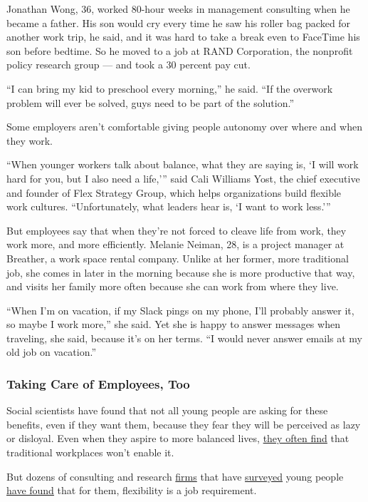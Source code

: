 Jonathan Wong, 36, worked 80-hour weeks in management consulting when he
became a father. His son would cry every time he saw his roller bag
packed for another work trip, he said, and it was hard to take a break
even to FaceTime his son before bedtime. So he moved to a job at RAND
Corporation, the nonprofit policy research group --- and took a 30
percent pay cut.

``I can bring my kid to preschool every morning,'' he said. ``If the
overwork problem will ever be solved, guys need to be part of the
solution.''

Some employers aren't comfortable giving people autonomy over where and
when they work.

``When younger workers talk about balance, what they are saying is, `I
will work hard for you, but I also need a life,''' said Cali Williams
Yost, the chief executive and founder of Flex Strategy Group, which
helps organizations build flexible work cultures. ``Unfortunately, what
leaders hear is, `I want to work less.'''

But employees say that when they're not forced to cleave life from work,
they work more, and more efficiently. Melanie Neiman, 28, is a project
manager at Breather, a work space rental company. Unlike at her former,
more traditional job, she comes in later in the morning because she is
more productive that way, and visits her family more often because she
can work from where they live.

``When I'm on vacation, if my Slack pings on my phone, I'll probably
answer it, so maybe I work more,'' she said. Yet she is happy to answer
messages when traveling, she said, because it's on her terms. ``I would
never answer emails at my old job on vacation.''

\hypertarget{taking-care-of-employees-too}{%
\subsubsection{Taking Care of Employees,
Too}\label{taking-care-of-employees-too}}

Social scientists have found that not all young people are asking for
these benefits, even if they want them, because they fear they will be
perceived as lazy or disloyal. Even when they aspire to more balanced
lives,
\href{https://www.nytimes.com/2015/07/31/upshot/millennial-men-find-work-and-family-hard-to-balance.html}{they
often find} that traditional workplaces won't enable it.

But dozens of consulting and research
\href{https://www.accenture.com/us-en/insight-gen-z-rising}{firms} that
have
\href{https://www2.deloitte.com/global/en/pages/about-deloitte/articles/millennialsurvey.html}{surveyed}
young people
\href{https://workforceinstitute.org/wp-content/uploads/2019/05/Meet-Gen-Z-Hopeful-Anxious-Hardworking-and-Searching-for-Inspiration.pdf}{have
found} that for them, flexibility is a job requirement.

